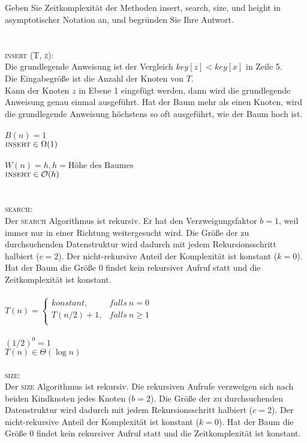 \documentclass{article}
\begin{document}
\subsection{}
Geben Sie  Zeitkomplexität der Methoden insert, search, size,  und height in asymptotischer Notation an, und begründen Sie Ihre Antwort.\\\\\\
\textsc {insert (T, z)}: \\
Die grundlegende Anweisung ist der Vergleich $key[z] < key[x]$ in Zeile 5. \\
Die Eingabegröße ist die Anzahl der Knoten von $T$. \\
Kann der Knoten $z$ in Ebene 1 eingefügt werden, dann wird die grundlegende Anweisung genau einmal ausgeführt. Hat der Baum mehr als einen Knoten, wird die grundlegende Anweisung höchstens so oft ausgeführt, wie der Baum hoch ist. \\\\
$B(n) = 1$\\
$\textsc {insert} \in \Omega(1)$ \\\\
$W(n) = h, h = \text{Höhe des Baumes}$\\
$\textsc {insert} \in \mathcal{O}(h)$ \\\\\\
\textsc {search}:\\
Der \textsc {search} Algorithmus ist rekursiv. Er hat den Verzweigungsfaktor $b = 1$, weil immer nur in einer Richtung weitergesucht wird. Die Größe der zu durchsuchenden Datenstruktur wird dadurch mit jedem Rekursionsschritt halbiert ($c=2$). Der nicht-rekursive Anteil der Komplexität ist konstant ($k = 0$). Hat der Baum die Größe $0$ findet kein rekursiver Aufruf statt und die Zeitkomplexität ist konstant.\\\\
$T(n) =
\begin{cases}
konstant, &falls\ n = 0\\
T(n/2) + 1, &falls\ n \geq 1\\
\end{cases}$\\\\
$(1/2)^0 = 1$\\
$T(n) \in \Theta(\log n)$\\\\
\textsc {size}:\\
Der \textsc {size} Algorithmus ist rekursiv. Die rekursiven Aufrufe verzweigen sich nach beiden Kindknoten jedes Knoten ($b=2$). Die Größe der zu durchsuchenden Datenstruktur wird dadurch mit jedem Rekursionsschritt halbiert ($c = 2$).  Der nicht-rekursive Anteil der Komplexität ist konstant ($k = 0$). Hat der Baum die Größe $0$ findet kein rekursiver Aufruf statt und die Zeitkomplexität ist konstant.\\\\
\end{document}

